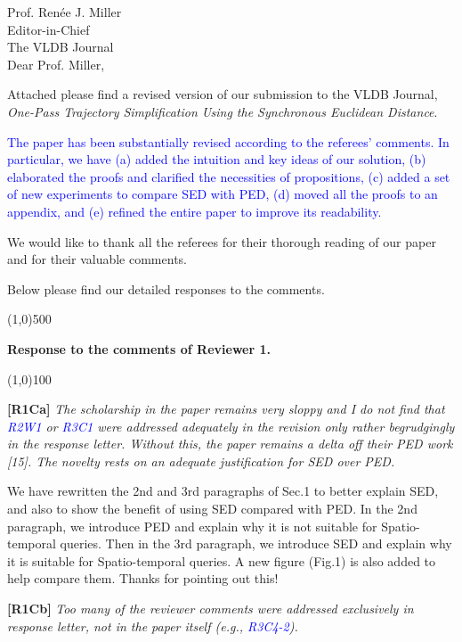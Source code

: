 \documentclass{letter}
\begin{document}
Prof. {Ren{\'{e}}e J. Miller} \\
Editor-in-Chief		\\
The VLDB Journal	\\



Dear Prof. Miller,

Attached please find a revised version of our submission to
the VLDB Journal, \emph{One-Pass Trajectory Simplification Using the Synchronous Euclidean Distance}.


\textcolor{blue}{The paper has been substantially revised according to the referees' comments. In particular, we have (a) added the intuition and key ideas of our solution, (b) elaborated the proofs and clarified the necessities of propositions, (c) added a set of new experiments to compare SED with PED, (d) moved all the proofs to an appendix, and (e) refined the entire paper to improve its readability.}

We would like to thank all the referees for their thorough reading of our paper and for their valuable comments.

Below please find our detailed responses to the comments.



\line(1,0){500}

\textbf{Response to the comments of Reviewer 1.}

\line(1,0){100}


\textbf{[R1Ca]} \emph{The scholarship in the paper remains very sloppy and I do not find that \textcolor{blue}{R2W1} or \textcolor{blue}{R3C1} were addressed adequately in the revision only rather begrudgingly in the response letter. Without this, the paper remains a delta off their PED work [15]. The novelty rests on an adequate justification for SED over PED.}

We have rewritten the 2nd and 3rd paragraphs of Sec.1 to better explain SED, and also to show the benefit of using SED compared with PED. In the 2nd paragraph, we introduce PED and explain why it is not suitable for Spatio-temporal queries. Then in the 3rd paragraph, we introduce SED and explain why it is suitable for Spatio-temporal queries. A new figure (Fig.1) is also added to help compare them. Thanks for pointing out this!


\textbf{[R1Cb]} \emph{Too many of the reviewer comments were addressed exclusively in response letter, not in the paper itself (e.g., \textcolor{blue}{R3C4-2}).}
\end{document}
